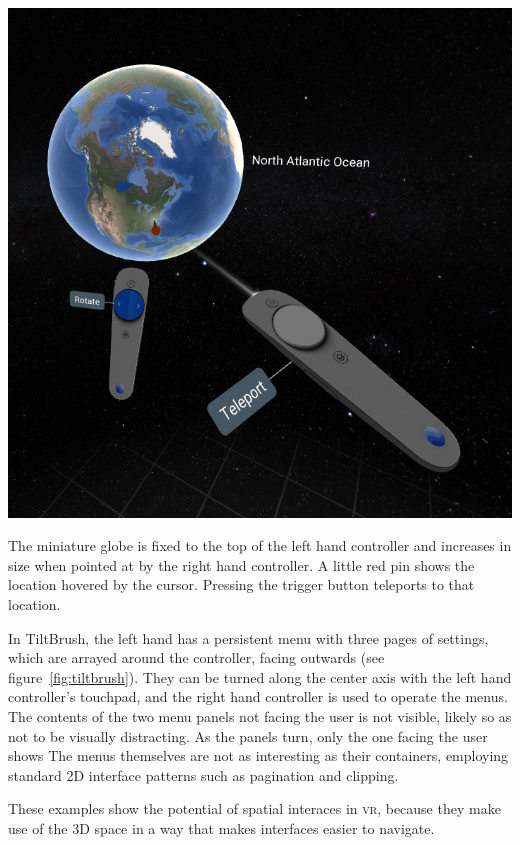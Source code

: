 \documentclass[nobib]{tufte-book} %
\begin{document}
\begin{marginfigure}
  \includegraphics[width=\linewidth]{globe.png}
  \caption{The miniature globe is fixed to the top of the left hand controller and increases in size when pointed at by the right hand controller. A little red pin shows the location hovered by the cursor. Pressing the trigger button teleports to that location.}
  \label{fig:globe}
\end{marginfigure}

In TiltBrush, the left hand has a persistent menu with three pages of settings, which are arrayed around the controller, facing outwards (see figure~\ref{fig:tiltbrush}). They can be turned along the center axis with the left hand controller's touchpad, and the right hand controller is used to operate the menus.
The contents of the two menu panels not facing the user is not visible, likely so as not to be visually distracting. As the panels turn, only the one facing the user shows
The menus themselves are not as interesting as their containers, employing standard 2D interface patterns such as pagination and clipping.

These examples show the potential of spatial interaces in \textsc{vr}, because they make use of the 3D space in a way that makes interfaces easier to navigate.
\end{document}
